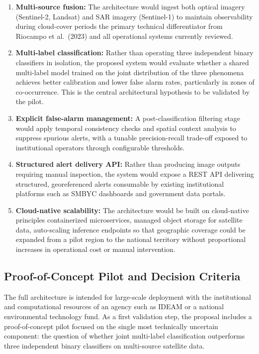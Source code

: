 \documentclass{article}
\begin{document}
\begin{enumerate}
    \item \textbf{Multi-source fusion:} The architecture would ingest both
    optical imagery (Sentinel-2, Landsat) and SAR imagery (Sentinel-1) to
    maintain observability during cloud-cover periods the primary technical
    differentiator from Riocampo et al.\ (2023) and all operational systems
    currently reviewed.
    \item \textbf{Multi-label classification:} Rather than operating three
    independent binary classifiers in isolation, the proposed system would
    evaluate whether a shared multi-label model trained on the joint
    distribution of the three phenomena achieves better calibration and lower
    false alarm rates, particularly in zones of co-occurrence. This is the
    central architectural hypothesis to be validated by the pilot.
    \item \textbf{Explicit false-alarm management:} A post-classification
    filtering stage would apply temporal consistency checks and spatial
    context analysis to suppress spurious alerts, with a tunable
    precision-recall trade-off exposed to institutional operators through
    configurable thresholds.
    \item \textbf{Structured alert delivery API:} Rather than producing image
    outputs requiring manual inspection, the system would expose a REST API
    delivering structured, georeferenced alerts consumable by existing
    institutional platforms such as SMBYC dashboards and government data
    portals.
    \item \textbf{Cloud-native scalability:} The architecture would be built
    on cloud-native principles containerized microservices, managed object
    storage for satellite data, auto-scaling inference endpoints so that
    geographic coverage could be expanded from a pilot region to the national
    territory without proportional increases in operational cost or manual
    intervention.
\end{enumerate}

\subsection{Proof-of-Concept Pilot and Decision Criteria}

The full architecture is intended for large-scale deployment with the
institutional and computational resources of an agency such as IDEAM or a
national environmental technology fund.
As a first validation step, the proposal includes a proof-of-concept pilot
focused on the single most technically uncertain component: the question of
whether joint multi-label classification outperforms three independent
binary classifiers on multi-source satellite data.
\end{document}
